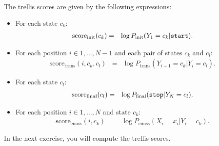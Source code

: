 The trellis scores are given by the following expressions:
\begin{itemize}
\item For each state $c_k$:
\begin{eqnarray}
\mathrm{score}_{\mathrm{init}}(c_k) &=&
\log P_{\mathrm{init}}(Y_{1} = c_k | \text{\tt start}).
\end{eqnarray}
\item For each position $i \in {1,\ldots,N-1}$ and each pair of states $c_k$ and $c_l$:
\begin{eqnarray}
\mathrm{score}_{\mathrm{trans}}(i, c_k, c_l) &=&
\log P_{\mathrm{trans}}(Y_{i+1} = c_k | Y_i = c_l).
\end{eqnarray}
\item For each state $c_l$:
\begin{eqnarray}
\mathrm{score}_{\mathrm{final}}(c_l) &=&
\log P_{\mathrm{final}}(\text{\tt stop} | Y_N = c_l).
\end{eqnarray}
\item For each position $i \in {1,\ldots,N}$ and state $c_k$:
\begin{eqnarray}
\mathrm{score}_{\mathrm{emiss}}(i, c_k) &=&
\log P_{\mathrm{emiss}}(X_i = x_i | Y_i = c_k).
\end{eqnarray}
\end{itemize}

In the next exercise, you will compute the trellis scores.


